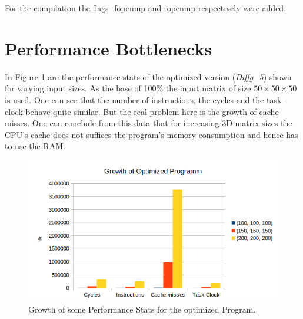 \documentclass[12pt,a4paper]{article}
\begin{document}
For the compilation the flags -fopenmp and -openmp respectively were added. 

\section{Performance Bottlenecks}

In Figure \ref{fig:growthoptimized} are the performance stats of the optimized version (\emph{Diffg\_5}) shown for varying input sizes. As the base of 100\% the input matrix of size $ 50\times 50 \times 50 $ is used. One can see that the number of instructions, the cycles and the task-clock behave quite similar. But the real problem here is the growth of cache-misses. One can conclude from this data that for increasing 3D-matrix sizes the CPU's cache does not suffices the program's memory consumption and hence has to use the RAM.  


\begin{figure}[h]
	\centering
	\includegraphics[width=1.0\linewidth]{"Benchmark 2/growthoptimized"}
	\caption{Growth of some Performance Stats for the optimized Program. }
	\label{fig:growthoptimized}
\end{figure}
\end{document}
